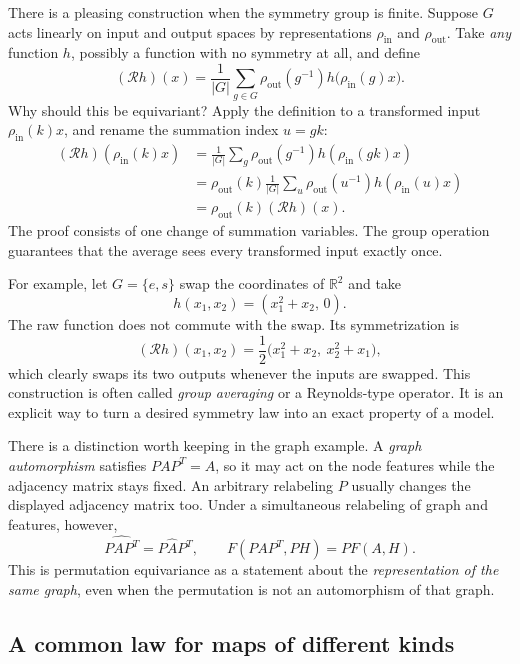 There is a pleasing construction when the symmetry group is finite. Suppose $G$ acts linearly on input and output spaces by representations $\rho_{\mathrm{in}}$ and $\rho_{\mathrm{out}}$. Take \emph{any} function $h$, possibly a function with no symmetry at all, and define
\[
 \boxed{(\mathcal Rh)(x)=\frac1{|G|}
  \sum_{g\in G}\rho_{\mathrm{out}}(g^{-1})
             h\bigl(\rho_{\mathrm{in}}(g)x\bigr).}
\]
Why should this be equivariant? Apply the definition to a transformed input $\rho_{\mathrm{in}}(k)x$, and rename the summation index $u=gk$:
\[
\begin{aligned}
 (\mathcal Rh)(\rho_{\mathrm{in}}(k)x)
 &=\frac1{|G|}\sum_g \rho_{\mathrm{out}}(g^{-1})
     h(\rho_{\mathrm{in}}(gk)x)\\
 &=\rho_{\mathrm{out}}(k)
     \frac1{|G|}\sum_u\rho_{\mathrm{out}}(u^{-1})
     h(\rho_{\mathrm{in}}(u)x)\\
 &=\rho_{\mathrm{out}}(k)(\mathcal Rh)(x).
\end{aligned}
\]
The proof consists of one change of summation variables. The group operation guarantees that the average sees every transformed input exactly once.

For example, let $G=\{e,s\}$ swap the coordinates of $\mathbb R^2$ and take
\[
 h(x_1,x_2)=(x_1^2+x_2,\,0).
\]
The raw function does not commute with the swap. Its symmetrization is
\[
 (\mathcal Rh)(x_1,x_2)
 =\frac12\bigl(x_1^2+x_2,\ x_2^2+x_1\bigr),
\]
which clearly swaps its two outputs whenever the inputs are swapped. This construction is often called \emph{group averaging} or a Reynolds-type operator. It is an explicit way to turn a desired symmetry law into an exact property of a model.

There is a distinction worth keeping in the graph example. A \emph{graph automorphism} satisfies $PAP^T=A$, so it may act on the node features while the adjacency matrix stays fixed. An arbitrary relabeling $P$ usually changes the displayed adjacency matrix too. Under a simultaneous relabeling of graph and features, however,
\[
 \widehat{PAP^T}=P\widehat A P^T,\qquad
 \boxed{F(PAP^T,PH)=PF(A,H).}
\]
This is permutation equivariance as a statement about the \emph{representation of the same graph}, even when the permutation is not an automorphism of that graph.

\subsection*{A common law for maps of different kinds}

